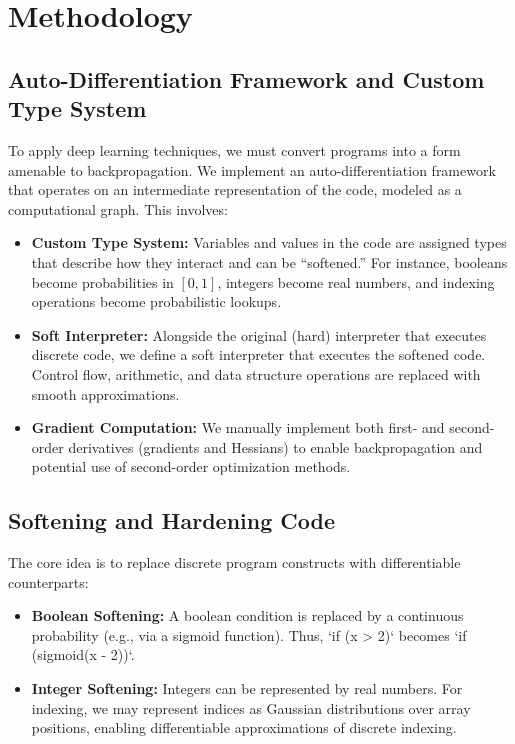 \documentclass{article}
\begin{document}
\section{Methodology}

\subsection{Auto-Differentiation Framework and Custom Type System}
To apply deep learning techniques, we must convert programs into a form amenable to backpropagation. We implement an auto-differentiation framework that operates on an intermediate representation of the code, modeled as a computational graph. This involves:
\begin{itemize}[leftmargin=*]
    \item \textbf{Custom Type System:} Variables and values in the code are assigned types that describe how they interact and can be ``softened.'' For instance, booleans become probabilities in $[0,1]$, integers become real numbers, and indexing operations become probabilistic lookups.
    \item \textbf{Soft Interpreter:} Alongside the original (hard) interpreter that executes discrete code, we define a soft interpreter that executes the softened code. Control flow, arithmetic, and data structure operations are replaced with smooth approximations.
    \item \textbf{Gradient Computation:} We manually implement both first- and second-order derivatives (gradients and Hessians) to enable backpropagation and potential use of second-order optimization methods.
\end{itemize}

\subsection{Softening and Hardening Code}
The core idea is to replace discrete program constructs with differentiable counterparts:
\begin{itemize}[leftmargin=*]
    \item \textbf{Boolean Softening:} A boolean condition is replaced by a continuous probability (e.g., via a sigmoid function). Thus, `if (x > 2)` becomes `if (sigmoid(x - 2))`.
    \item \textbf{Integer Softening:} Integers can be represented by real numbers. For indexing, we may represent indices as Gaussian distributions over array positions, enabling differentiable approximations of discrete indexing.
\end{itemize}
\end{document}
